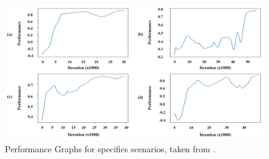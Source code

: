 \documentclass{acmsiggraph}               %
\begin{document}
\begin{figure}[h]
  \centering
  \includegraphics[width=1\linewidth]{images/aiPerformance.png}
  \caption{Performance Graphs for specifics scenarios, taken from \protect\cite{lee_crowd_2018}.}
  \label{fig:aiPerformance}
\end{figure}


\nocite{*}

\end{document}
